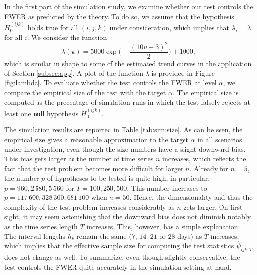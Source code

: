 \documentclass[a4paper,12pt]{article}
\numberwithin{equation}{section}
\begin{document}
In the first part of the simulation study, we examine whether our test controls the FWER as predicted by the theory. To do so, we assume that the hypothesis $H_0^{(ijk)}$ holds true for all $(i,j,k)$ under consideration, which implies that $\lambda_i = \lambda$ for all $i$. We consider the function 
\begin{equation}\label{eq:lambda}
\lambda(u) = 5000 \exp\Big(-\frac{(10 u-3)^2}{2}\Big) + 1000, 
\end{equation}
which is similar in shape to some of the estimated trend curves in the application of Section \ref{subsec:app}. A plot of the function $\lambda$ is provided in Figure \ref{fig:lambda}. To evaluate whether the test controls the FWER at level $\alpha$, we compare the empirical size of the test with the target $\alpha$. The empirical size is computed as the precentage of simulation runs in which the test falsely rejects at least one null hypothesis $H_0^{(ijk)}$.


The simulation results are reported in Table \ref{tab:sim:size}. As can be seen, the empirical size gives a reasonable approximation to the target $\alpha$ in all scenarios under investigation, even though the size numbers have a slight downward bias. This bias gets larger as the number of time series $n$ increases, which reflects the fact that the test problem becomes more difficult for larger $n$. Already for $n=5$, the number $p$ of hypotheses to be tested is quite high, in particular, $p = 960, 2\,680, 5\,560$ for $T=100,250,500$. This number increases to $p=117\,600, 328\,300, 681\,100$ when $n=50$. Hence, the dimensionality and thus the complexity of the test problem increases considerably as $n$ gets larger. On first sight, it may seem astonishing that the downward bias does not diminish notably as the time series length $T$ increases. This, however, has a simple explanation: The interval lengths $h_k$ remain the same ($7$, $14$, $21$ or $28$ days) as $T$ increases, which implies that the effective sample size for computing the test statistics $\hat{\psi}_{ijk,T}$ does not change as well. To summarize, even though slightly conservative, the test controls the FWER quite accurately in the simulation setting at hand. 
\end{document}
